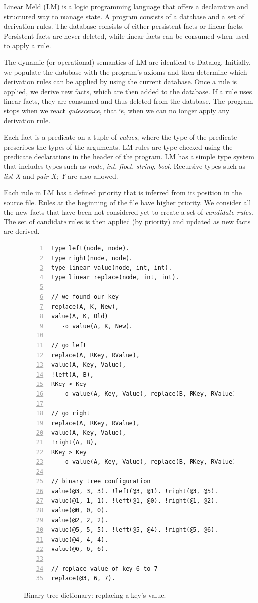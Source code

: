 \newcommand{\selector}[0]{[~S~\Rightarrow~y;~BE~] \lolli HE}
\newcommand{\comprehension}[0]{\{~\widehat{x};~BE;~SH~\}}
\newcommand{\aggregate}[0]{[~A~\Rightarrow~y;~\widehat{x};~BE;~SH_1;~SH_2~]}

Linear Meld (LM) is a logic programming language that offers a declarative and structured way to manage state.
A program consists of a database and a set of derivation rules. The database consists of either persistent facts
or linear facts. Persistent facts are never deleted, while linear facts can be consumed when used to apply a rule.

The dynamic (or operational) semantics of LM are identical to Datalog.
Initially, we populate the database with the program's axioms and then determine which derivation rules can be applied by using the current database. Once a rule is applied, we derive new facts, which are then added to the database.
If a rule uses linear facts, they are consumed and thus deleted from the database.
The program stops when we reach \emph{quiescence}, that is, when we can no longer apply any derivation rule.

Each fact is a predicate on a tuple of \emph{values}, where the type of the predicate prescribes the types of the arguments.
LM rules are type-checked using the predicate declarations in the header of the program. LM has a simple type system that includes types such as
\emph{node}, \emph{int}, \emph{float}, \emph{string}, \emph{bool}. Recursive types such as \emph{list X} and \emph{pair X; Y} are
also allowed.

Each rule in LM has a defined priority that is inferred from its position in the source file.
Rules at the beginning of the file have higher priority. We consider all
the new facts that have been not considered yet to create a set of \emph{candidate rules}.
The set of candidate rules is then applied (by priority) and updated as new facts are derived.


{\footnotesize
\begin{figure}[h]
\scriptsize\begin{Verbatim}[numbers=left]
type left(node, node).
type right(node, node).
type linear value(node, int, int).
type linear replace(node, int, int).

// we found our key
replace(A, K, New),
value(A, K, Old)
   -o value(A, K, New).

// go left
replace(A, RKey, RValue),
value(A, Key, Value),
!left(A, B),
RKey < Key
   -o value(A, Key, Value), replace(B, RKey, RValue).

// go right
replace(A, RKey, RValue),
value(A, Key, Value),
!right(A, B),
RKey > Key
   -o value(A, Key, Value), replace(B, RKey, RValue).

// binary tree configuration
value(@3, 3, 3). !left(@3, @1). !right(@3, @5).
value(@1, 1, 1). !left(@1, @0). !right(@1, @2).
value(@0, 0, 0).
value(@2, 2, 2).
value(@5, 5, 5). !left(@5, @4). !right(@5, @6).
value(@4, 4, 4).
value(@6, 6, 6).

// replace value of key 6 to 7
replace(@3, 6, 7).
\end{Verbatim}
\caption{Binary tree dictionary: replacing a key's value.}
  \label{code:btree_replace}
\end{figure}
}

